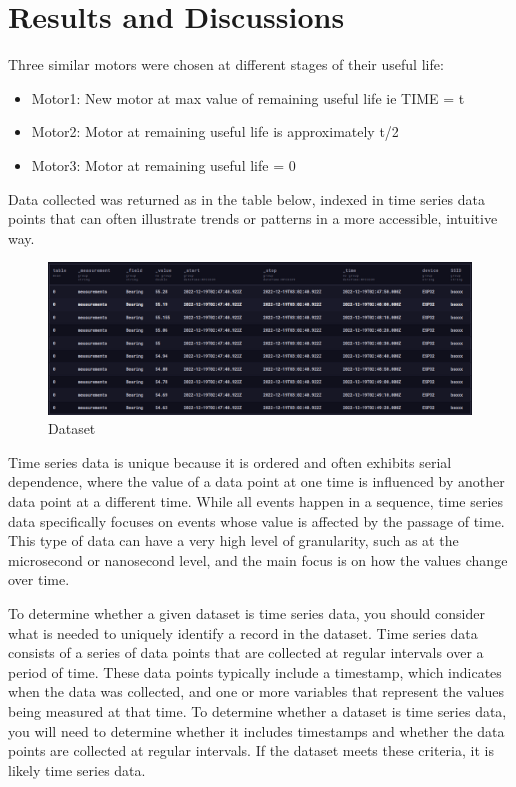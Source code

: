 \section{Results and Discussions }
Three similar motors were chosen at different stages of their useful life:
\begin{itemize}
	\item Motor1: New motor at max value of remaining useful life ie TIME = t
	\item Motor2: Motor at remaining useful life is approximately  t/2
	\item Motor3: Motor at remaining useful life = 0   
\end{itemize} 

Data collected was returned as in the table below, indexed in time series data points that can often illustrate trends or patterns in a more accessible, intuitive way.

\begin{figure}[!h]
	\includegraphics[width=1.0\linewidth]{Figures/csvdataset}
	\caption{Dataset}
\end{figure}
 \pagebreak
Time series data is unique because it is ordered and often exhibits serial dependence, where the value of a data point at one time is influenced by another data point at a different time. While all events happen in a sequence, time series data specifically focuses on events whose value is affected by the passage of time. This type of data can have a very high level of granularity, such as at the microsecond or nanosecond level, and the main focus is on how the values change over time.

To determine whether a given dataset is time series data, you should consider what is needed to uniquely identify a record in the dataset. Time series data consists of a series of data points that are collected at regular intervals over a period of time. These data points typically include a timestamp, which indicates when the data was collected, and one or more variables that represent the values being measured at that time. To determine whether a dataset is time series data, you will need to determine whether it includes timestamps and whether the data points are collected at regular intervals. If the dataset meets these criteria, it is likely time series data. 

